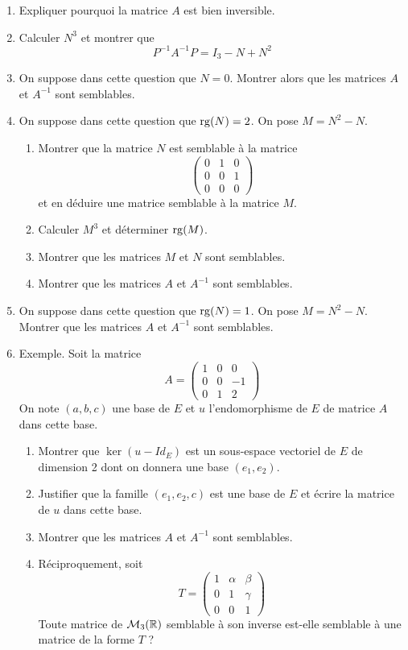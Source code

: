 \begin{enumerate}
\item Expliquer pourquoi la matrice $A$ est bien inversible.
\item Calculer $N^3$ et montrer que
\[P^{-1}A^{-1}P=I_3-N+N^2\]
\item On suppose dans cette question que $N=0$. Montrer alors que les matrices $A$ et $A^{-1}$ sont semblables.
\item On suppose dans cette question que $\operatorname{rg} (N)=2$. On pose $M=N^2-N$.
\begin{enumerate}
 \item Montrer que la matrice $N$ est semblable à la matrice
\begin{displaymath}
\left( \begin{array}{ccc}
0 & 1 & 0 \\ 
0 & 0 & 1 \\ 
0 & 0 & 0
    \end{array}\right) 
\end{displaymath}
et en déduire une matrice semblable à la matrice $M$.
\item Calculer $M^3$ et déterminer $\operatorname{rg} (M)$.
\item Montrer que les matrices $M$ et $N$ sont semblables.
\item Montrer que les matrices $A$ et $A^{-1}$ sont semblables.
\end{enumerate}
\item On suppose dans cette question que $\operatorname{rg} (N)=1$. On pose $M=N^2-N$. Montrer que les matrices $A$ et $A^{-1}$ sont semblables.
\item Exemple. Soit la matrice 
\begin{displaymath}
A = \left( \begin{array}{ccc}
1 & 0 & 0 \\ 
0 & 0 & -1 \\ 
0 & 1 & 2
    \end{array}\right) 
\end{displaymath}
On note $(a,b,c)$ une base de $E$ et $u$ l'endomorphisme de $E$ de matrice $A$ dans cette base.
\begin{enumerate}
 \item Montrer que $\ker (u- Id_E)$ est un sous-espace vectoriel de $E$ de dimension 2 dont on donnera une base $(e_1,e_2)$.
\item Justifier que la famille $(e_1,e_2,c)$ est une base de $E$ et écrire la matrice de $u$ dans cette base.
\item Montrer que les matrices $A$ et $A^{-1}$ sont semblables.
\item Réciproquement, soit 
\begin{displaymath}
T = \left( \begin{array}{ccc}
1 & \alpha & \beta \\ 
0 & 1 & \gamma \\ 
0 & 0 & 1
    \end{array}\right) 
\end{displaymath}
Toute matrice de $\mathcal{M}_3(\mathbb{R})$ semblable à son inverse est-elle semblable à une matrice de la forme $T$ ?
\end{enumerate}

\end{enumerate}
